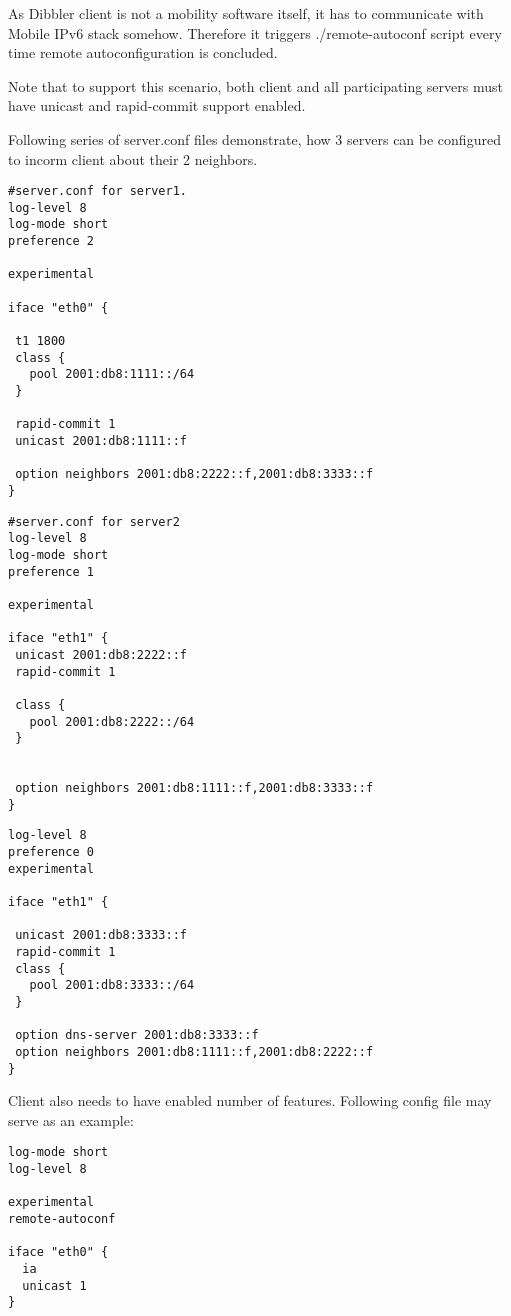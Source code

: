 As Dibbler client is not a mobility software itself, it has to
communicate with Mobile IPv6 stack somehow. Therefore it triggers
./remote-autoconf script every time remote autoconfiguration is
concluded.

Note that to support this scenario, both client and all participating
servers must have unicast and rapid-commit support enabled.

Following series of server.conf files demonstrate, how 3 servers can
be configured to incorm client about their 2 neighbors.

\begin{lstlisting}
#server.conf for server1.
log-level 8
log-mode short
preference 2

experimental

iface "eth0" {

 t1 1800
 class {
   pool 2001:db8:1111::/64
 }

 rapid-commit 1
 unicast 2001:db8:1111::f

 option neighbors 2001:db8:2222::f,2001:db8:3333::f
}
\end{lstlisting}

\begin{lstlisting}
#server.conf for server2
log-level 8
log-mode short
preference 1

experimental

iface "eth1" {
 unicast 2001:db8:2222::f
 rapid-commit 1

 class {
   pool 2001:db8:2222::/64
 }


 option neighbors 2001:db8:1111::f,2001:db8:3333::f
}
\end{lstlisting}

\begin{lstlisting}
log-level 8
preference 0
experimental

iface "eth1" {

 unicast 2001:db8:3333::f
 rapid-commit 1
 class {
   pool 2001:db8:3333::/64
 }

 option dns-server 2001:db8:3333::f
 option neighbors 2001:db8:1111::f,2001:db8:2222::f
}
\end{lstlisting}

Client also needs to have enabled number of features. Following config
file may serve as an example:

\begin{lstlisting}
log-mode short
log-level 8

experimental
remote-autoconf

iface "eth0" {
  ia
  unicast 1
}
\end{lstlisting}

